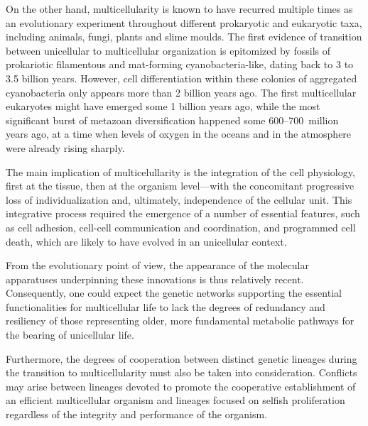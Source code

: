 \documentclass{tufte-book}
\begin{document}

On the other hand, multicellularity is known to have recurred multiple times as
an evolutionary experiment throughout different prokaryotic and eukaryotic taxa,
including animals, fungi, plants and slime moulds.\cite{kaiser_building_2001}
The first evidence of transition between unicellular to multicellular
organization is epitomized by fossils of prokariotic filamentous and
\mbox{mat-forming} \mbox{cyanobacteria-like}, dating back to 3 to 3.5 billion
years.\cite{knoll_life_2003,schopf_microfossils_1993} However, cell
differentiation within these colonies of aggregated cyanobacteria only appears
more than 2 billion years ago.\cite{tomitani_evolutionary_2006} The first
multicellular eukaryotes might have emerged some 1 billion years
ago,\cite{knoll_eukaryotic_2006} while the most significant burst of metazoan
diversification happened some \mbox{600--700~million} years ago, at a time when
levels of oxygen in the oceans and in the atmosphere were already rising
sharply.\cite{carroll_chance_2001,king_unicellular_2004}

The main implication of multicelullarity is the integration of the cell
physiology, first at the tissue, then at the organism level---with the
concomitant progressive loss of individualization and, ultimately, independence
of the cellular unit.  This integrative process required the emergence of a
number of essential features, such as cell adhesion, \mbox{cell-cell}
communication and coordination, and programmed cell death, which are likely to
have evolved in an unicellular
context.\cite{bonner_development:_1974,bonner_first_2009,kaiser_building_2001}

From the evolutionary point of view, the appearance of the molecular apparatuses
underpinning these innovations is thus relatively recent.  Consequently, one
could expect the genetic networks supporting the essential functionalities for
multicellular life to lack the degrees of redundancy and resiliency of those
representing older, more fundamental metabolic pathways for the bearing of
unicellular life.

Furthermore, the degrees of cooperation between distinct genetic lineages during
the transition to multicellularity must also be taken into consideration.
Conflicts may arise between lineages devoted to promote the cooperative
establishment of an efficient multicellular organism and lineages focused on
selfish proliferation regardless of the integrity and performance of the
organism.\cite{buss_evolution_1987,hammerstein_genetic_2003}
\end{document}
